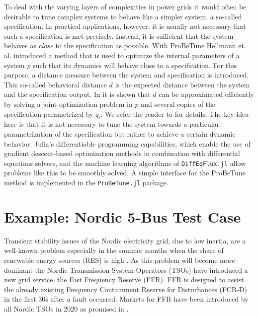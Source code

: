 \documentclass[conference]{IEEEtran}
\begin{document}
To deal with the varying layers of complexities in power grids it would often be desirable to tune complex systems to behave like a simpler system, a so-called specification. In practical applications, however, it is usually not necessary that such a specification is met precisely. Instead, it is sufficient that the system behaves as \emph{close} to the specification as possible. With ProBeTune Hellmann et. al. \cite{hellmann2021probetune} introduced a method that is used to optimize the internal parameters of a system $p$ such that its dynamics will behave close to a specification. For this purpose, a distance measure between the system and specification is introduced. 
This so-called behavioral distance $d$ is the expected distance between the system and the specification output. In \cite{hellmann2021probetune} it is shown that $d$ can be approximated efficiently by solving a joint optimization problem in $p$ and several copies of the specification parametrized by $q_i$. We refer the reader to \cite{hellmann2021probetune} for details.
The key idea here is that it is not necessary to tune the system towards a particular parametrization of the specification but rather to achieve a certain dynamic behavior.
Julia's differentiable programming capabilities, which enable the use of gradient descent-based optimization methods in combination with differential equations solvers, and the machine learning algorithms of \texttt{DiffEqFlux.jl} \cite{rackauckas2019diffeqflux} allow problems like this to be smoothly solved. A simple interface for the ProBeTune method is implemented in the \texttt{ProBeTune.jl} package.
    
\section{Example: Nordic 5-Bus Test Case}
\label{sec:nordic5}
Transient stability issues of the Nordic electricity grid, due to low inertia, are a well-known problem especially in the summer months when the share of renewable energy sources (RES) is high \cite{inertia_challenge}. As this problem will become more dominant the Nordic Transmission System Operators (TSOs) have introduced a new grid service, the Fast Frequency Reserve (FFR). FFR is designed to assist the already existing Frequency Containment Reserve for Disturbances (FCR-D) in the first 30s after a fault occurred. Markets for FFR have been introduced by all Nordic TSOs in 2020 as promised in \cite{inertia_challenge}.
\end{document}
